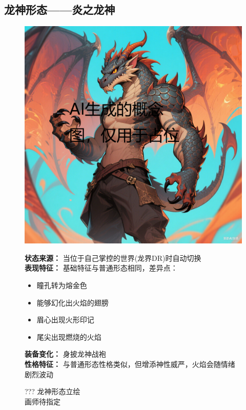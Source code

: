 \documentclass[lang=cn,newtx,10pt,scheme=chinese]{elegantbook}
\newcommand{\dr}{???}
\begin{document}
\newpage

\subsection{龙神形态——炎之龙神}

\noindent
\begin{figure}[H]
    \begin{minipage}[c]{0.48\textwidth}
        \centering
        \includegraphics[width=\linewidth]{drago/god.png}
        \caption{\dr{} 龙神形态立绘\\ \centering 画师待指定}
        \label{fig:drgod}
    \end{minipage}
    \hfill
    \begin{minipage}[c]{0.48\textwidth}
        \textbf{状态来源：} 当位于自己掌控的世界(龙界DR)时自动切换\\
        \textbf{表现特征：}
        基础特征与普通形态相同，差异点：
        \begin{itemize}
            \setlength\itemsep{0em}
            \item 瞳孔转为熔金色
            \item 能够幻化出火焰的翅膀
            \item 眉心出现火形印记
            \item 尾尖出现燃烧的火焰
        \end{itemize}
        \textbf{装备变化：} 身披龙神战袍\\
        \textbf{性格特征：} 与普通形态性格类似，但增添神性威严，火焰会随情绪剧烈波动\\
        \vspace*{\fill}
    \end{minipage}
\end{figure}
\end{document}
